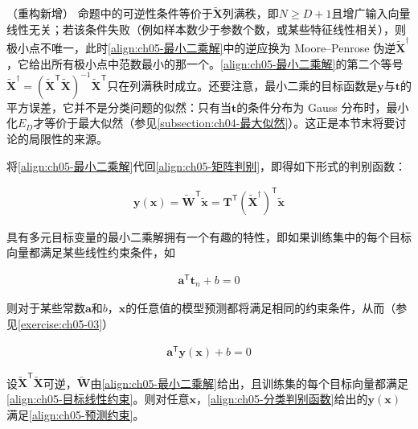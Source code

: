 \documentclass[../../main.tex]{subfiles}
\begin{document}
\begin{remark}（重构新增）
命题中的可逆性条件等价于$\tilde{\boldsymbol{X}}$列满秩，即$N\geqslant D+1$且增广输入向量线性无关；若该条件失败（例如样本数少于参数个数，或某些特征线性相关），则极小点不唯一，此时\eqref{align:ch05-最小二乘解}中的逆应换为 Moore--Penrose 伪逆$\tilde{\boldsymbol{X}}^{\dagger}$，它给出所有极小点中范数最小的那一个。\eqref{align:ch05-最小二乘解}的第二个等号$\tilde{\boldsymbol{X}}^{\dagger}=(\tilde{\boldsymbol{X}}^{\mathsf{T}}\tilde{\boldsymbol{X}})^{-1}\tilde{\boldsymbol{X}}^{\mathsf{T}}$只在列满秩时成立。还要注意，最小二乘的目标函数是$\boldsymbol{y}$与$\boldsymbol{t}$的平方误差，它并不是分类问题的似然：只有当$\boldsymbol{t}$的条件分布为 Gauss 分布时，最小化$E_D$才等价于最大似然（参见\cref{subsection:ch04-最大似然}）。这正是本节末将要讨论的局限性的来源。
\end{remark}

将\eqref{align:ch05-最小二乘解}代回\eqref{align:ch05-矩阵判别}，即得如下形式的判别函数：

\begin{align}
  \boldsymbol{y}(\boldsymbol{x})=\tilde{\boldsymbol{W}}^{\mathsf{T}}\tilde{\boldsymbol{x}}=\boldsymbol{T}^{\mathsf{T}}(\tilde{\boldsymbol{X}}^{\dagger})^{\mathsf{T}}\tilde{\boldsymbol{x}}
  \label{align:ch05-分类判别函数}
\end{align}

具有多元目标变量的最小二乘解拥有一个有趣的特性，即如果训练集中的每个目标向量都满足某些线性约束条件，如

\begin{align}
  \boldsymbol{a}^{\mathsf{T}}\boldsymbol{t}_n+b=0
  \label{align:ch05-目标线性约束}
\end{align}

则对于某些常数$\boldsymbol{a}$和$b$，$\boldsymbol{x}$的任意值的模型预测都将满足相同的约束条件，从而（参见\cref{exercise:ch05-03}）

\begin{align}
  \boldsymbol{a}^{\mathsf{T}}\boldsymbol{y}(\boldsymbol{x})+b=0
  \label{align:ch05-预测约束}
\end{align}

\begin{proposition}[最小二乘预测保持目标向量的线性约束]\label{proposition:ch05-预测保持约束}
设$\tilde{\boldsymbol{X}}^{\mathsf{T}}\tilde{\boldsymbol{X}}$可逆，$\tilde{\boldsymbol{W}}$由\eqref{align:ch05-最小二乘解}给出，且训练集的每个目标向量都满足\eqref{align:ch05-目标线性约束}。则对任意$\boldsymbol{x}$，\eqref{align:ch05-分类判别函数}给出的$\boldsymbol{y}(\boldsymbol{x})$满足\eqref{align:ch05-预测约束}。
\end{proposition}
\end{document}
